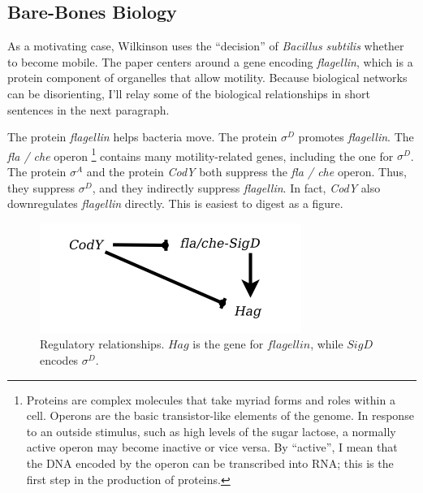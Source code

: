 \documentclass{article}
\begin{document}
\subsection{Bare-Bones Biology}
 As a motivating case, Wilkinson uses the ``decision'' of {\it Bacillus subtilis} whether to become mobile. The paper centers around a gene encoding {\it flagellin}, which is a protein component of organelles that allow motility. Because biological networks can be disorienting, I'll relay some of the biological relationships in short sentences in the next paragraph. 

The protein {\it flagellin} helps bacteria move. The protein $\sigma^D$ promotes {\it flagellin}. The {\it fla / che} operon \footnote{Proteins are complex molecules that take myriad forms and roles within a cell. Operons are the basic transistor-like elements of the genome. In response to an outside stimulus, such as high levels of the sugar lactose, a normally active operon may become inactive or vice versa. By ``active'', I mean that the DNA encoded by the operon can be transcribed into RNA; this is the first step in the production of proteins.} contains many motility-related genes, including the one for $\sigma^D$. The protein $\sigma^A$ and the protein {\it CodY} both suppress the {\it fla / che} operon. Thus, they suppress $\sigma^D$, and they indirectly suppress {\it flagellin}. In fact, {\it CodY} also downregulates {\it flagellin} directly. This is easiest to digest as a figure.

\begin{figure}[h!]
\begin{center}
\includegraphics[scale=0.5]{wilkinson_reg_network.png}
\caption{Regulatory relationships. $Hag$ is the gene for $flagellin$, while $SigD$ encodes $\sigma^D$.}
\end{center}
\label{fig:}
\end{figure}


%
% 
\end{document}
